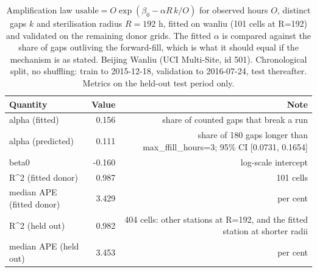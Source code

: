 \begin{table}[htbp]
\caption{Amplification law $\mathrm{usable} = O\exp(\beta_0 - \alpha R\,k/O)$ for observed hours $O$, distinct gaps $k$ and sterilisation radius $R=192$ h, fitted on wanliu (101 cells at R=192) and validated on the remaining donor grids. The fitted $\alpha$ is compared against the share of gaps outliving the forward-fill, which is what it should equal if the mechanism is as stated. Beijing Wanliu (UCI Multi-Site, id 501). Chronological split, no shuffling: train to 2015-12-18, validation to 2016-07-24, test thereafter. Metrics on the held-out test period only.}
\label{tab:missingness_law}
\begin{tabular}{lrr}
\toprule
Quantity & Value & Note \\
\midrule
alpha (fitted) & 0.156 & share of counted gaps that break a run \\
alpha (predicted) & 0.111 & share of 180 gaps longer than max\_ffill\_hours=3; 95\% CI [0.0731, 0.1654] \\
beta0 & -0.160 & log-scale intercept \\
R\textasciicircum{}2 (fitted donor) & 0.987 & 101 cells \\
median APE (fitted donor) & 3.429 & per cent \\
R\textasciicircum{}2 (held out) & 0.982 & 404 cells: other stations at R=192, and the fitted station at shorter radii \\
median APE (held out) & 3.453 & per cent \\
\bottomrule
\end{tabular}
\end{table}
